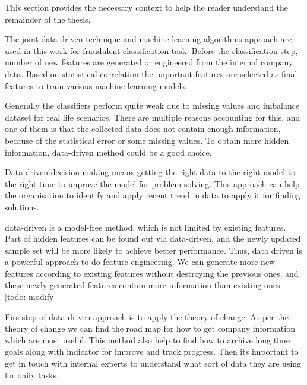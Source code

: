 This section provides the necessary context to help the reader understand the remainder of the thesis.

The joint data-driven technique and machine learning algorithms approach are used in this work for fraudulent classification task. Before the classification step, number of new features are generated or engineered from the internal company data. Based on statistical correlation the important features are selected as final features to train various machine learning models. 


Generally the classifiers perform quite weak due to missing values and imbalance dataset for real life scenarios. There are
multiple reasons accounting for this, and one of them is that the
collected data does not contain enough information, because of
the statistical error or some missing values. To obtain more hidden
information, data-driven method could be a good choice. 

Data-driven decision making means getting the right data to the right model to the right time to improve the model for problem solving. This approach can help the organisation to identify and apply recent trend in data to apply it for finding solutions. 


data-driven is a model-free method, which
is not limited by existing features. Part of hidden features can be
found out via data-driven, and the newly updated sample set will
be more likely to achieve better performance. Thus, data driven is
a powerful approach to do feature engineering. We can generate
more new features according to existing features without
destroying the previous ones, and these newly generated features
contain more information than existing ones. [todo: modify]

Firs step of data driven approach is to apply the theory of change. As per the theory of change we can find the road map for how to get company information which are most useful. This method also help to find how to archive long time goals along with indicator for improve and track progress. Then its important to get in touch with internal experts to understand what sort of data they are using for daily tasks. 


